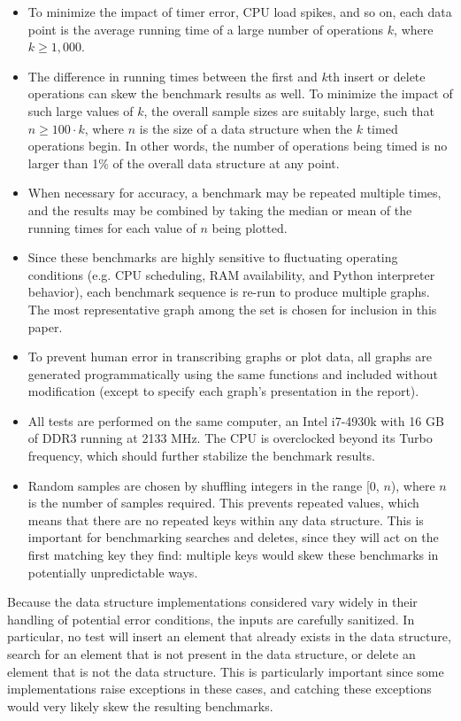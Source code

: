 \documentclass{article}
\begin{document}
\begin{itemize}
    \item To minimize the impact of timer error, CPU load spikes, and so on, each data point is the average running time of a large number of operations $k$, where $k \geq 1,000$.
    \item The difference in running times between the first and $k$th insert or delete operations can skew the benchmark results as well. To minimize the impact of such large values of $k$, the overall sample sizes are suitably large, such that $n \geq 100 \cdot k$, where $n$ is the size of a data structure when the $k$ timed operations begin. In other words, the number of operations being timed is no larger than 1\% of the overall data structure at any point.
    \item When necessary for accuracy, a benchmark may be repeated multiple times, and the results may be combined by taking the median or mean of the running times for each value of $n$ being plotted.
    \item Since these benchmarks are highly sensitive to fluctuating operating conditions (e.g. CPU scheduling, RAM availability, and Python interpreter behavior), each benchmark sequence is re-run to produce multiple graphs. The most representative graph among the set is chosen for inclusion in this paper.
    \item To prevent human error in transcribing graphs or plot data, all graphs are generated programmatically using the same functions and included without modification (except to specify each graph's presentation in the report).
    \item All tests are performed on the same computer, an Intel i7-4930k with 16 GB of DDR3 running at 2133 MHz. The CPU is overclocked beyond its Turbo frequency, which should further stabilize the benchmark results.
    \item Random samples are chosen by shuffling integers in the range [0, $n$), where $n$ is the number of samples required. This prevents repeated values, which means that there are no repeated keys within any data structure. This is important for benchmarking searches and deletes, since they will act on the first matching key they find: multiple keys would skew these benchmarks in potentially unpredictable ways.
\end{itemize}

Because the data structure implementations considered vary widely in their handling of potential error conditions, the inputs are carefully sanitized. In particular, no test will insert an element that already exists in the data structure, search for an element that is not present in the data structure, or delete an element that is not the data structure. This is particularly important since some implementations raise exceptions in these cases, and catching these exceptions would very likely skew the resulting benchmarks.
\end{document}
